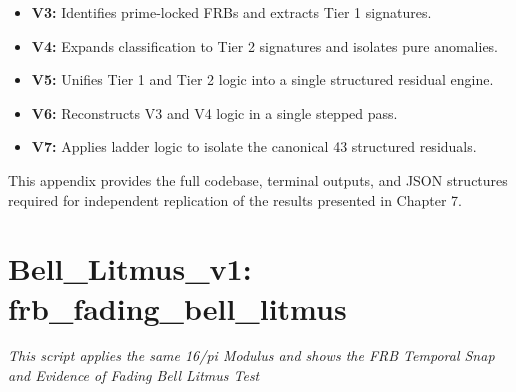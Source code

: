 \documentclass[11pt, letterpaper, openany]{book}
\begin{document}
\begin{itemize}
    \item \textbf{V3:} Identifies prime-locked FRBs and extracts Tier 1 signatures.
    \item \textbf{V4:} Expands classification to Tier 2 signatures and isolates pure anomalies.
    \item \textbf{V5:} Unifies Tier 1 and Tier 2 logic into a single structured residual engine.
    \item \textbf{V6:} Reconstructs V3 and V4 logic in a single stepped pass.
    \item \textbf{V7:} Applies ladder logic to isolate the canonical 43 structured residuals.
\end{itemize}

This appendix provides the full codebase, terminal outputs, and JSON 
structures required for independent replication of the results presented 
in Chapter 7.


\chapter{Bell\_Litmus\_v1: frb\_fading\_bell\_litmus}
\label{app:frb\_fading\_bell\_litmus}
\textit{This script applies the same 16/pi Modulus and shows the FRB Temporal Snap and Evidence of Fading Bell Litmus Test}
\end{document}
